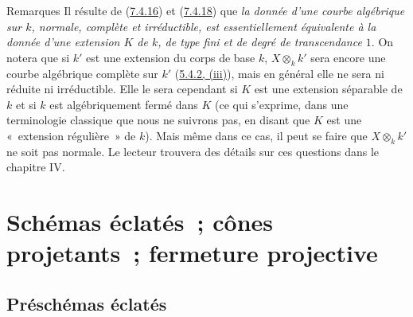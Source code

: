 \begin{namedtheorem}[7.4.19]{Remarques}
\label{II.7.4.19-fr}
Il résulte de (\hyperref[II.7.4.16-fr]{7.4.16}) et
(\hyperref[II.7.4.18-fr]{7.4.18}) que \emph{la donnée d'une courbe algébrique
sur $k$, normale, complète et irréductible, est essentiellement équivalente à
la donnée d'une extension $K$ de $k$, de type fini et de degré de
transcendance $1$}. On notera que si $k'$ est une extension du corps de base
$k$, $X\otimes_k k'$ sera encore une courbe algébrique complète sur $k'$
(\hyperref[II.5.4.2-fr]{5.4.2, (iii)}), mais en général elle ne sera ni réduite
ni irréductible. Elle le sera cependant si $K$ est une extension séparable de
$k$ et si $k$ est algébriquement fermé dans $K$ (ce qui s'exprime, dans une
terminologie classique que nous ne suivrons pas, en disant que $K$ est une
«~extension régulière~» de $k$). Mais même dans ce cas, il peut se faire que
$X\otimes_k k'$ ne soit pas normale. Le lecteur trouvera des détails sur ces
questions dans le chapitre IV.
\end{namedtheorem}

\section{Schémas éclatés~; cônes projetants~; fermeture projective}
\label{section:II.8-fr}

\subsection{Préschémas éclatés}
\label{subsection:II.8.1-fr}

